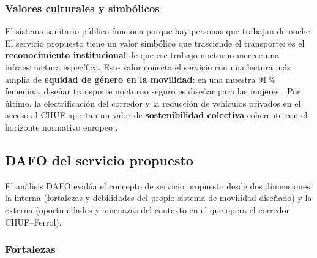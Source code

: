 \subsubsection{Valores culturales y simbólicos}
\label{sec:valores-simbolicos}

El sistema sanitario público funciona porque hay personas que
trabajan de noche. El servicio propuesto tiene un valor simbólico
que trasciende el transporte: es el \textbf{reconocimiento
institucional} de que ese trabajo nocturno merece una
infraestructura específica. Este valor conecta el servicio con
una lectura más amplia de \textbf{equidad de género en la
movilidad}: en una muestra 91\,\% femenina, diseñar transporte
nocturno seguro es diseñar para las mujeres
\parencite{LouridoRegueira2026}. Por último, la electrificación
del corredor y la reducción de vehículos privados en el acceso
al CHUF aportan un valor de \textbf{sostenibilidad colectiva}
coherente con el horizonte normativo europeo
\parencite{CE_Movilidad2020}.

\subsection{DAFO del servicio propuesto}\label{sec:dafo}

El análisis DAFO evalúa el concepto de servicio propuesto desde
dos dimensiones: la interna (fortalezas y debilidades del propio
sistema de movilidad diseñado) y la externa (oportunidades y
amenazas del contexto en el que opera el corredor CHUF--Ferrol).

\subsubsection{Fortalezas}
\label{sec:dafo-fortalezas}

